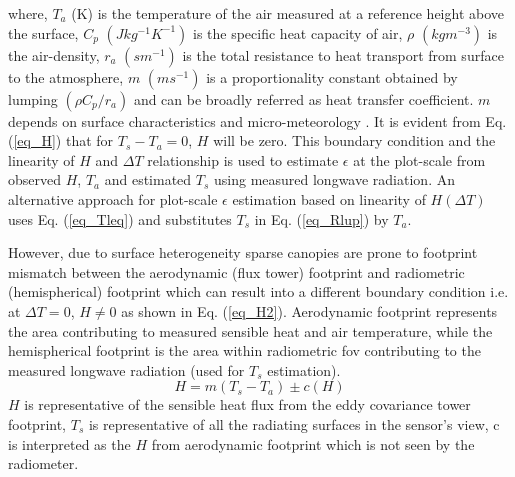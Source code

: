 \documentclass[fleqn,10pt]{wlscirep}
\begin{document}
where, $T_{a}$ (K) is the temperature of the air measured at a reference height above the surface, $C_{p}$ $(J kg^{-1} K^{-1})$ is the specific heat capacity of air, $\rho$ $(kgm^{-3})$ is the air-density, $r_{a}$ $(s m^{-1})$ is the total resistance to heat transport from surface to the atmosphere, $m$ $(ms^{-1})$ is a proportionality constant obtained by lumping $(\rho C_{p}/r_{a})$ and can be broadly referred as heat transfer coefficient. $m$ depends on surface characteristics and micro-meteorology \cite{lhomme_radiative_1988}. It is evident from Eq. (\ref{eq_H}) that for $T_{s} - T_{a} = 0$, $H$ will be zero. This boundary condition and the linearity of $H$ and $\Delta T $ relationship is used to estimate $\epsilon$ at the plot-scale from observed $H$, $T_a$ and estimated $T_{s}$ using measured longwave radiation\cite{holmes_land_2009,holmes_cloud_2016-1}. An alternative approach for plot-scale $\epsilon$ estimation based on linearity of $H (\Delta T)$ uses Eq. (\ref{eq_Tleq}) and substitutes $T_{s}$ in Eq. (\ref{eq_Rlup}) by $T_{a}$\cite{maes2019potential}. %

However, due to surface heterogeneity sparse canopies are prone to footprint mismatch between the aerodynamic (flux tower) footprint and radiometric (hemispherical) footprint \cite{chu2021representativeness,marcolla2018geometry,morillas2013using} which can result into a different boundary condition i.e. at $\Delta T =0$, $H \not= 0$ as shown in Eq. (\ref{eq_H2}). Aerodynamic footprint represents the area contributing to measured sensible heat and air temperature, while the hemispherical footprint is the area within radiometric fov contributing to the measured longwave radiation (used for $T_{s}$ estimation).
\begin{equation}\label{eq_H2}
H= m(T_{s} - T_{a}) \pm  c(H)
\end{equation}
$H$ is representative of the sensible heat flux from the eddy covariance tower footprint, $T_{s}$ is representative of all the radiating surfaces in the sensor’s view, c is interpreted as the $H$ from aerodynamic footprint which is not seen by the radiometer. 
\end{document}
